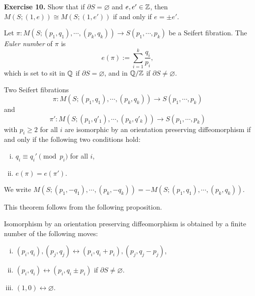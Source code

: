 \documentclass{../../../small}
\begin{document}
\noindent\textbf{Exercise 10.} Show that if $\partial S=\varnothing$ and $e,e'\in\mathbb{Z}$, then $M(S;(1,e))\cong M(S;(1,e'))$ if and only if $e=\pm e'$.

Let $\pi:M(S;(p_1,q_1),\cdots,(p_k,q_k))\to S(p_1,\cdots,p_k)$ be a Seifert fibration.
The \emph{Euler number} of $\pi$ is
\[e(\pi):=\sum_{i=1}^k\frac{q_i}{p_i},\]
which is set to sit in $\mathbb{Q}$ if $\partial S=\varnothing$, and in $\mathbb{Q}/\mathbb{Z}$ if $\partial S\ne\varnothing$.


\begin{thm}
Two Seifert fibrations
\[\pi:M(S;(p_1,q_1),\cdots,(p_k,q_k))\to S(p_1,\cdots,p_k)\]
and
\[\pi':M(S;(p_1,q'_1),\cdots,(p_k,q'_k))\to S(p_1,\cdots,p_k)\]
with $p_i\ge2$ for all $i$ are isomorphic by an orientation preserving diffeomorphism if and only if the following two conditions hold:
\begin{enumerate}[(i)]
\item $q_i\equiv q_i'\pmod{p_i}$ for all $i$,
\item $e(\pi)=e(\pi')$.
\end{enumerate}
\end{thm}
\begin{rmk*}
We write $M(S;(p_1,-q_1),\cdots,(p_k,-q_k))=-M(S;(p_1,q_1),\cdots,(p_k,q_k))$. 
\end{rmk*}
This theorem follows from the following proposition.
\begin{prop}
Isomorphism by an orientation preserving diffeomorphism is obtained by a finite number of the following moves:
\begin{enumerate}[(i)]
\item $(p_i,q_i),(p_j,q_j)\leftrightarrow(p_i,q_i+p_i),(p_j,q_j-p_j)$,
\item $(p_i,q_i)\leftrightarrow(p_i,q_i\pm p_i)$ if $\partial S\ne\varnothing$.
\item $(1,0)\leftrightarrow\varnothing$.
\end{enumerate}
\end{prop}
\end{document}

